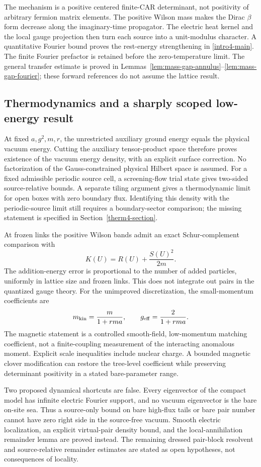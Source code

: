 The mechanism is a positive centered finite-CAR determinant, not
positivity of arbitrary fermion matrix elements. The positive Wilson
mass makes the Dirac $\beta$ form decrease along the imaginary-time
propagator. The electric heat kernel and the local gauge projection
then turn each source into a unit-modulus character. A quantitative
Fourier bound proves the rest-energy strengthening in
\eqref{intro4-main}. The finite Fourier prefactor is retained before
the zero-temperature limit. The general transfer estimate is proved
in Lemmas~\ref{lem:mass-gap-annulus}--\ref{lem:mass-gap-fourier};
these forward references do not assume the lattice result.

\subsection{Thermodynamics and a sharply scoped low-energy result}

At fixed $a,g^2,m,r$, the unrestricted auxiliary ground energy equals
the physical vacuum energy. Cutting the auxiliary tensor-product
space therefore proves existence of the vacuum energy density,
with an explicit surface correction. No factorization of the
Gauss-constrained physical Hilbert space is assumed. For a fixed
admissible periodic source cell, a screening-flow trial state gives
two-sided source-relative bounds. A separate tiling argument gives
a thermodynamic limit for open boxes with zero boundary flux.
Identifying this density with the periodic-source limit still
requires a boundary-sector comparison; the missing statement is
specified in Section~\ref{therm4-section}.

At frozen links the positive Wilson bands admit an exact
Schur-complement comparison with
\[
 K(U)=R(U)+\frac{S(U)^2}{2m}.
\]
The addition-energy error is proportional to the number of added
particles, uniformly in lattice size and frozen links.
This does not integrate out pairs in the quantized gauge theory.
For the unimproved discretization, the small-momentum coefficients are
\[
 m_{\rm kin}=\frac{m}{1+rma},\qquad
 g_{\rm eff}=\frac{2}{1+rma}.
\]
The magnetic statement is a controlled smooth-field, low-momentum
matching coefficient, not a finite-coupling measurement of the
interacting anomalous moment. Explicit scale inequalities include
nuclear charge. A bounded magnetic clover modification can restore
the tree-level coefficient while preserving determinant positivity
in a stated bare-parameter range.

Two proposed dynamical shortcuts are false. Every eigenvector of
the compact model has infinite electric Fourier support, and no
vacuum eigenvector is the bare on-site sea. Thus a source-only bound
on bare high-flux tails or bare pair number cannot have zero
right side in the source-free vacuum. Smooth electric localization,
an explicit virtual-pair density bound, and the local-annihilation
remainder lemma are proved instead. The remaining dressed
pair-block resolvent and source-relative remainder estimates are
stated as open hypotheses, not consequences of locality.

